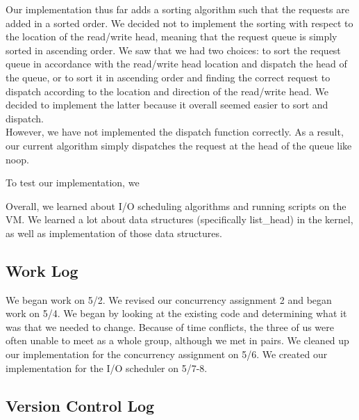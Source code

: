 \documentclass[journal, letterpaper, draftclsnofoot, onecolumn, 10pt]{IEEEtran}
\begin{document}
Our implementation thus far adds a sorting algorithm such that the requests are added in a sorted order. We decided not to implement
the sorting with respect to the location of the read/write head, meaning that the request queue is simply sorted in ascending order.
We saw that we had two choices: to sort the request queue in accordance with the read/write head location and dispatch the head of
the queue, or to sort it in ascending order and finding the correct request to dispatch according to the location and direction of
the read/write head. We decided to implement the latter because it overall seemed easier to sort and dispatch. \\

However, we have not implemented the dispatch function correctly. As a result, our current algorithm simply dispatches the request
at the head of the queue like noop.


To test our implementation, we


Overall, we learned about I/O scheduling algorithms and running scripts on the VM. We learned a lot about data structures
(specifically list\_head) in the kernel, as well as implementation of those data structures.\\

\subsection{Work Log}
We began work on 5/2. We revised our concurrency assignment 2 and began work on 5/4. We began by looking
at the existing code and determining what it was that we needed to change. Because of time conflicts, the three of us were often unable
to meet as a whole group, although we met in pairs. We cleaned up our implementation for the concurrency assignment on 5/6.
We created our implementation for the I/O scheduler on 5/7-8.

\clearpage
\subsection{Version Control Log}
\end{document}
